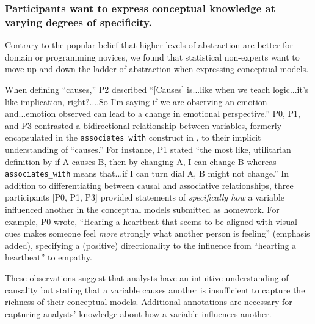 \subsubsection{Participants want to express conceptual knowledge at varying degrees of specificity.}
Contrary to the popular belief that higher levels of abstraction are better for
domain or programming novices, we found that statistical non-experts want to
move up and down the ladder of abstraction when expressing conceptual models. 

When defining ``causes,'' P2 described ``[Causes] is...like when we teach
logic...it's like implication, right?....So I'm saying if we are observing an
emotion and...emotion observed can lead to a change in emotional perspective.''
P0, P1, and P3 contrasted a bidirectional relationship between variables,
formerly encapsulated in the \texttt{associates\_with} construct in \tisane, to
their implicit understanding of ``causes.'' For instance, P1 stated ``the most
like, utilitarian definition by if A causes B, then by changing A, I can change
B whereas \texttt{associates\_with} means that...if I can turn dial A, B might
not change.'' In addition to differentiating between causal and associative
relationships, three participants [P0, P1, P3] provided statements of
\textit{specifically how} a variable influenced another in the conceptual models
submitted as homework. For example, P0 wrote, ``Hearing a heartbeat that seems to
be aligned with visual cues makes someone feel \textit{more} strongly what
another person is feeling'' (emphasis added), specifying a (positive)
directionality to the influence from ``hearting a heartbeat'' to empathy. 

These observations suggest that analysts have an intuitive understanding of
causality but stating that a variable causes another is insufficient to capture
the richness of their conceptual models. Additional annotations are necessary
for capturing analysts' knowledge about how a variable influences
another.


